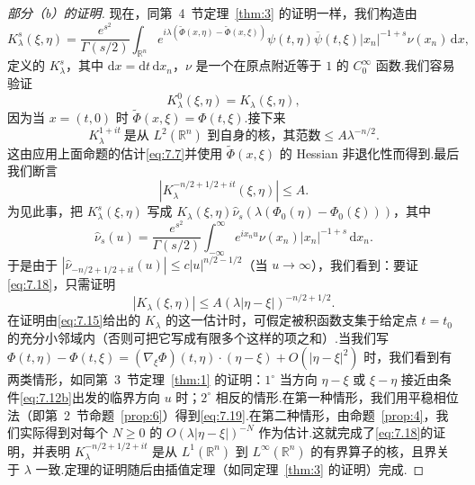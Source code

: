 \documentclass[
  BookTitleCN={傅里叶分析中的振动积分},
  BookTitleEN={Oscillatory Integrals in Fourier Analysis},
  OriginalAuthor={E.~M. Stein},
  OriginalEdition={Proc. Sympos. Pure Math. 35, Part~1},
  OriginalPublisher={American Mathematical Society},
  OriginalYear={1979},
  Translator={翻译及重排},
  ModelUsed={Codex CLI},
  Biblatex=false,
  TranslationDate={2026年8月27日}
]{mathtranslation}
\numberwithin{equation}{chapter}   %
\newcommand{\R}{\mathbb{R}}
\begin{document}
\begin{proof}[部分（b）的证明]
  现在，同第~4~节定理~\ref{thm:3} 的证明一样，我们构造由
  \[
    K_{\lambda}^{s}(\xi,\eta)=\frac{e^{s^{2}}}{\Gamma(s/2)}\int_{\R^{n}}e^{i\lambda(\widetilde{\Phi}(x,\eta)-\widetilde{\Phi}(x,\xi))}\psi(t,\eta)\overline{\psi}(t,\xi)|x_{n}|^{-1+s}\nu(x_{n})\,\mathrm{d}x,
  \]
  定义的 $K_{\lambda}^{s}$，其中 $\mathrm{d}x=\mathrm{d}t\,\mathrm{d}x_{n}$，$\nu$ 是一个在原点附近等于 $1$ 的 $C_{0}^{\infty}$ 函数.我们容易验证
  \begin{equation}
    K_{\lambda}^{0}(\xi,\eta)=K_{\lambda}(\xi,\eta), \label{eq:7.16}
  \end{equation}
  因为当 $x=(t,0)$ 时 $\widetilde{\Phi}(x,\xi)=\Phi(t,\xi)$.接下来
  \begin{equation}
    K_{\lambda}^{1+it}\ \text{是从 }L^{2}(\R^{n})\text{ 到自身的核，其范数}\leq A\lambda^{-n/2} . \label{eq:7.17}
  \end{equation}
  这由应用上面命题的估计\eqref{eq:7.7}并使用 $\widetilde{\Phi}(x,\xi)$ 的 Hessian 非退化性而得到.最后我们断言
  \begin{equation}
    |K_{\lambda}^{-n/2+1/2+it}(\xi,\eta)|\leq A . \label{eq:7.18}
  \end{equation}
  为见此事，把 $K_{\lambda}^{s}(\xi,\eta)$ 写成 $K_{\lambda}(\xi,\eta)\hat{\nu}_{s}(\lambda(\Phi_{0}(\eta)-\Phi_{0}(\xi)))$，其中
  \[
    \hat{\nu}_{s}(u)=\frac{e^{s^{2}}}{\Gamma(s/2)}\int_{-\infty}^{\infty}e^{ix_{n}u}\nu(x_{n})|x_{n}|^{-1+s}\,\mathrm{d}x_{n} .
  \]
  于是由于 $|\hat{\nu}_{-n/2+1/2+it}(u)|\leq c|u|^{n/2-1/2}$（当 $u\to\infty$），我们看到：要证\eqref{eq:7.18}，只需证明
  \begin{equation}
    |K_{\lambda}(\xi,\eta)|\leq A(\lambda|\eta-\xi|)^{-n/2+1/2} . \label{eq:7.19}
  \end{equation}
  在证明由\eqref{eq:7.15}给出的 $K_{\lambda}$ 的这一估计时，可假定被积函数支集于给定点 $t=t_{0}$ 的充分小邻域内（否则可把它写成有限多个这样的项之和）.当我们写 $\Phi(t,\eta)-\Phi(t,\xi)=(\nabla_{\xi}\Phi)(t,\eta)\cdot(\eta-\xi)+O(|\eta-\xi|^{2})$ 时，我们看到有两类情形，如同第~3~节定理~\ref{thm:1} 的证明：$1^{\circ}$ 当方向 $\eta-\xi$ 或 $\xi-\eta$ 接近由条件\eqref{eq:7.12b}出发的临界方向 $u$ 时；$2^{\circ}$ 相反的情形.在第一种情形，我们用平稳相位法（即第~2~节命题~\ref{prop:6}）得到\eqref{eq:7.19}.在第二种情形，由命题~\ref{prop:4}，我们实际得到对每个 $N\geq0$ 的 $O(\lambda|\eta-\xi|)^{-N}$ 作为估计.这就完成了\eqref{eq:7.18}的证明，并表明 $K_{\lambda}^{-n/2+1/2+it}$ 是从 $L^{1}(\R^{n})$ 到 $L^{\infty}(\R^{n})$ 的有界算子的核，且界关于 $\lambda$ 一致.定理的证明随后由插值定理（如同定理~\ref{thm:3} 的证明）完成.
\end{proof}
\end{document}
